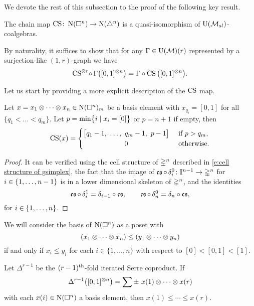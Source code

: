 We devote the rest of this subsection to the proof of the following key result.

\begin{theorem} \label{t:main local}
	The chain map $\CS \colon \chains(\cube^n) \to \chains(\simplex^n)$ is a quasi-isomorphism of $\USL$-coalgebras.
\end{theorem}

By naturality, it suffices to show that for any $\Gamma \in \UM(r)$ represented by a surjection-like $(1,r)$-graph we have
\begin{equation*}
	\CS^{\ot r} \! \circ \, \Gamma \big( [0,1]^{\ot n} \big) =
	\Gamma \circ \CS \big( [0,1]^{\ot n} \big).
\end{equation*}

Let us start by providing a more explicit description of the $\CS$ map.

\begin{lemma} \label{l:cs explicit}
	Let $x = x_1 \ot \cdots \ot x_n \in \chains(\cube^n)_m$ be a basis element with $x_{q_i} = [0,1]$ for all $\{q_1 < \dots < q_m\}$.
	Let $p = \min \set[\big]{i \mid x_i = [0]}$ or $p = n+1$ if empty, then
	\[
	\CS(x) =
	\begin{cases}
		\big[ q_1-1, \ \dots , \ q_m-1, \ p-1 \big] & \text{ if } p > q_m, \\
		\hfil 0 & \text{ otherwise}.
	\end{cases}
	\]
\end{lemma}

\begin{proof}
	It can be verified using the cell structure of $\gsimplex^n$ described in \cref{e:cell structure of gsimplex}, the fact that the image of $\cs \circ \, \delta^0_i \colon \gcube^{n-1} \to \gsimplex^n$ for $i \in \set{1,\dots,n-1}$ is in a lower dimensional skeleton of $\gsimplex^n$, and the identities
	\[
	\cs \circ \, \delta_i^1 = \delta_{i-1} \circ \cs,
	\qquad
	\cs \circ \, \delta_n^0 = \delta_n \circ \cs,
	\]
	for $i \in \set{1, \dots, n}$.
\end{proof}

We will consider the basis of $\chains(\cube^n)$ as a poset with
\[
(x_1 \ot \cdots \ot x_n) \leq (y_1 \ot \cdots \ot y_n)
\]
if and only if $x_i \leq y_i$ for each $i \in \{1, \dots, n\}$ with respect to $[0] < [0,1] < [1]$.

\begin{lemma}
	Let $\Delta^{r-1}$ be the $(r-1)^\th$-fold iterated Serre coproduct.
	If
	\[
	\Delta^{r-1} \big([0,1]^{\ot n}\big) =
	\sum \pm \ x{(1)} \ot \cdots \ot x{(r)}
	\]
	with each $x(i) \in \chains(\cube^n)$ a basis element, then $x{(1)} \leq \cdots \leq x{(r)}$.
\end{lemma}

